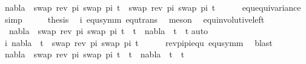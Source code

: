 \begin{isabellebody}
\ {\isachardoublequoteopen}nabla\ {\isasymturnstile}\ swap\ {\isacharparenleft}{\kern0pt}rev\ pi{\isacharparenright}{\kern0pt}\ {\isacharparenleft}{\kern0pt}swap\ pi\ t{}{\isacharparenright}{\kern0pt}\ {\isasymapprox}\ swap\ {\isacharparenleft}{\kern0pt}rev\ pi{\isacharparenright}{\kern0pt}\ {\isacharparenleft}{\kern0pt}swap\ pi\ t{}{\isacharparenright}{\kern0pt}{\isachardoublequoteclose}\isanewline
\ \ \ \ \isamarkupfalse%
\ equ{\isacharunderscore}{\kern0pt}equivariance\ \isamarkupfalse%
\ simp\isanewline
\ \ \isamarkupfalse%
\ \isamarkupfalse%
\ {\isacharquery}{\kern0pt}thesis\ \isamarkupfalse%
\ i\ equ{\isacharunderscore}{\kern0pt}symm\ equ{\isacharunderscore}{\kern0pt}trans\ \isamarkupfalse%
\ meson\ \isanewline
{}\isamarkupfalse%
%
\endisatagproof
{\isafoldproof}%
%
\isadelimproof
\isanewline
%
\endisadelimproof
\isanewline
\isanewline
{}\isamarkupfalse%
\ equ{\isacharunderscore}{\kern0pt}involutive{\isacharunderscore}{\kern0pt}left{\isacharcolon}{\kern0pt}\ \isanewline
\ \ {\isachardoublequoteopen}nabla\ {\isasymturnstile}\ swap\ {\isacharparenleft}{\kern0pt}rev\ pi{\isacharparenright}{\kern0pt}\ {\isacharparenleft}{\kern0pt}swap\ pi\ t{}{\isacharparenright}{\kern0pt}\ {\isasymapprox}\ t{}\ {\isacharequal}{\kern0pt}\ nabla\ {\isasymturnstile}\ t{}\ {\isasymapprox}\ t{}{\isachardoublequoteclose}\isanewline
%
\isadelimproof
%
\endisadelimproof
%
\isatagproof
{}\isamarkupfalse%
{\isacharparenleft}{\kern0pt}auto{\isacharparenright}{\kern0pt}\isanewline
\ \ \isamarkupfalse%
\ i{\isacharcolon}{\kern0pt}\ {\isachardoublequoteopen}nabla\ {\isasymturnstile}\ t{}\ {\isasymapprox}\ swap\ {\isacharparenleft}{\kern0pt}rev\ pi{\isacharparenright}{\kern0pt}\ {\isacharparenleft}{\kern0pt}swap\ pi\ t{}{\isacharparenright}{\kern0pt}{\isachardoublequoteclose}\isanewline
\ \ \ \ \isamarkupfalse%
\ rev{\isacharunderscore}{\kern0pt}pi{\isacharunderscore}{\kern0pt}pi{\isacharunderscore}{\kern0pt}equ\ equ{\isacharunderscore}{\kern0pt}symm\ \isamarkupfalse%
\ blast\isanewline
\ \ \isamarkupfalse%
\ {\isachardoublequoteopen}nabla\ {\isasymturnstile}\ swap\ {\isacharparenleft}{\kern0pt}rev\ pi{\isacharparenright}{\kern0pt}\ {\isacharparenleft}{\kern0pt}swap\ pi\ t{}{\isacharparenright}{\kern0pt}\ {\isasymapprox}\ t{}\ {\isasymLongrightarrow}\ nabla\ {\isasymturnstile}\ t{}\ {\isasymapprox}\ t{}{\isachardoublequoteclose}\isanewline

\end{isabellebody}
